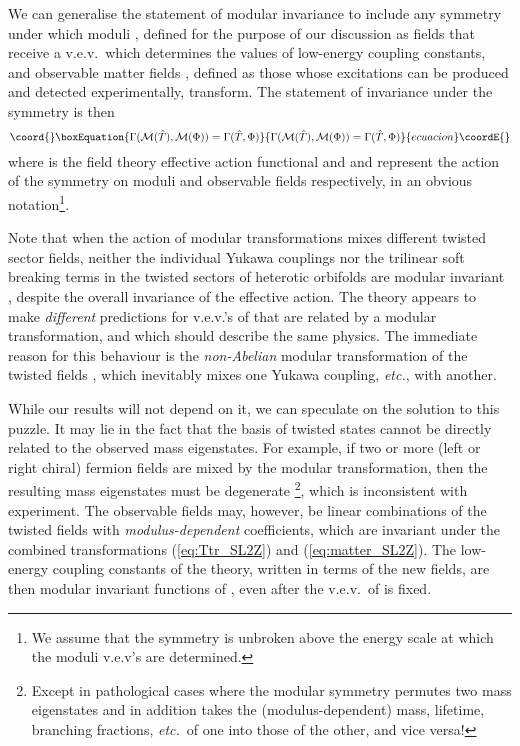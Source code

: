 \documentclass[a4paper,12pt]{article}
\begin{document}
We can generalise the statement of modular invariance to include any symmetry under which moduli \coordHE{}, defined for the purpose of our discussion as fields that receive a v.e.v.\ which determines the values of low-energy coupling constants, and observable matter fields \myHighlight{$\Phi$}\coordHE{}, defined as those whose excitations can be produced and detected experimentally, transform. The statement of invariance under the symmetry is then
\begin{equation}\coord{}\boxEquation{
\Gamma(\mathcal{M}(\hat{T}),\mathcal{M}(\Phi)) = \Gamma(\hat{T},\Phi) 
\label{eq:modinv}
}{
\Gamma(\mathcal{M}(\hat{T}),\mathcal{M}(\Phi)) = \Gamma(\hat{T},\Phi) 
}{ecuacion}\coordE{}\end{equation}
where \coordHE{} is the field theory effective action functional and \coordHE{} and \coordHE{} represent the action of the symmetry on moduli and observable fields respectively, in an obvious notation\footnote{We assume that the symmetry is unbroken above the energy scale at which the moduli v.e.v's are determined.}.

Note that when the action of modular transformations mixes different twisted sector fields, neither the individual Yukawa couplings nor the trilinear soft breaking terms in the twisted sectors of heterotic orbifolds are modular invariant \cite{Bailin:1998iz+97,mythesis}, despite the overall invariance of the effective action. The theory appears to make {\em different}\/ predictions for v.e.v.'s of \coordHE{} that are related by a modular transformation, and which should describe the same physics. The immediate reason for this behaviour is the {\em non-Abelian}\/ modular transformation \coordHE{} of the twisted fields \cite{FerraraLT,LauerMN91}, which inevitably mixes one Yukawa coupling, {\em etc.}\/, with another.

While our results will not depend on it, we can speculate on the solution to this puzzle. It may lie in the fact that the basis of twisted states cannot be directly related to the observed mass eigenstates. For example, if two or more (left or right chiral) fermion fields are mixed by the modular transformation, then the resulting mass eigenstates must be degenerate \cite{mythesis}\footnote{Except in pathological cases where the modular symmetry permutes two mass eigenstates and in addition takes the (modulus-dependent) mass, lifetime, branching fractions, {\em etc.\/}\ of one into those of the other, and vice versa!}, which is inconsistent with experiment. The observable fields may, however, be linear combinations of the twisted fields with {\em modulus-dependent}\/ coefficients, which are invariant under the combined transformations (\ref{eq:Ttr_SL2Z}) and (\ref{eq:matter_SL2Z}). The low-energy coupling constants of the theory, written in terms of the new fields, are then modular invariant functions of \coordHE{}, even after the v.e.v.\ of \coordHE{} is fixed.
\end{document}

